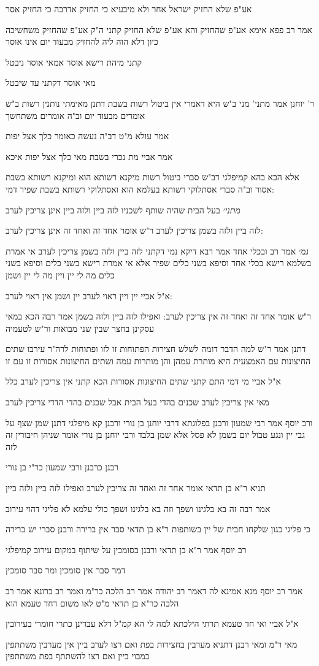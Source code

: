 \documentclass[12pt, openany]{book}
\newcommand{\sethebfont}{
\fontsize{10.5pt}{21.0pt} \selectfont
}
\newcommand{\textblock}[1]{
{\sethebfont #1\\}	
}
\begin{document}
\textblock{אע"פ שלא החזיק ישראל אחר ולא מיבעיא כי החזיק אדרבה כי החזיק אסר}
\textblock{אמר רב פפא אימא אע"פ שהחזיק והא אע"פ שלא החזיק קתני ה"ק אע"פ שהחזיק משחשיכה כיון דלא הוה ליה להחזיק מבעוד יום אינו אוסר}
\textblock{קתני מיהת רישא אוסר אמאי אוסר ניבטל}
\textblock{מאי אוסר דקתני עד שיבטל}
\textblock{ר' יוחנן אמר מתני' מני ב"ש היא דאמרי אין ביטול רשות בשבת דתנן מאימתי נותנין רשות ב"ש אומרים מבעוד יום וב"ה אומרים משתחשך}
\textblock{אמר עולא מ"ט דב"ה נעשה כאומר כלך אצל יפות}
\textblock{אמר אביי מת נכרי בשבת מאי כלך אצל יפות איכא}
\textblock{אלא הכא בהא קמיפלגי דב"ש סברי ביטול רשות מיקנא רשותא הוא ומיקנא רשותא בשבת אסור וב"ה סברי אסתלוקי רשותא בעלמא הוא ואסתלוקי רשותא בשבת שפיר דמי:}
\textblock{{\large\emph{מתני׳}} בעל הבית שהיה שותף לשכניו לזה ביין ולזה ביין אינן צריכין לערב}
\textblock{לזה ביין ולזה בשמן צריכין לערב ר"ש אומר אחד זה ואחד זה אינן צריכין לערב:}
\textblock{{\large\emph{גמ׳}} אמר רב ובכלי אחד אמר רבא דיקא נמי דקתני לזה ביין ולזה בשמן צריכין לערב אי אמרת בשלמא רישא בכלי אחד וסיפא בשני כלים שפיר אלא אי אמרת רישא בשני כלים וסיפא בשני כלים מה לי יין ויין מה לי יין ושמן}
\textblock{א"ל אביי יין ויין ראוי לערב יין ושמן אין ראוי לערב:}
\textblock{ר"ש אומר אחד זה ואחד זה אין צריכין לערב: ואפילו לזה ביין ולזה בשמן אמר רבה הכא במאי עסקינן בחצר שבין שני מבואות ור"ש לטעמיה}
\textblock{דתנן אמר ר"ש למה הדבר דומה לשלש חצירות הפתוחות זו לזו ופתוחות לרה"ר עירבו שתים החיצונות עם האמצעית היא מותרת עמהן והן מותרות עמה ושתים החיצונות אסורות זו עם זו}
\textblock{א"ל אביי מי דמי התם קתני שתים החיצונות אסורות הכא קתני אין צריכין לערב כלל}
\textblock{מאי אין צריכין לערב שכנים בהדי בעל הבית אבל שכנים בהדי הדדי צריכין לערב}
\textblock{ורב יוסף אמר רבי שמעון ורבנן בפלוגתא דרבי יוחנן בן נורי ורבנן קא מיפלגי דתנן שמן שצף על גבי יין ונגע טבול יום בשמן לא פסל אלא שמן בלבד ורבי יוחנן בן נורי אומר שניהן חיבורין זה לזה}
\textblock{רבנן כרבנן ורבי שמעון כר"י בן נורי}
\textblock{תניא ר"א בן תדאי אומר אחד זה ואחד זה צריכין לערב ואפילו לזה ביין ולזה ביין}
\textblock{אמר רבה זה בא בלגינו ושפך וזה בא בלגינו ושפך כולי עלמא לא פליגי דהוי עירוב}
\textblock{כי פליגי כגון שלקחו חבית של יין בשותפות ר"א בן תדאי סבר אין ברירה ורבנן סברי יש ברירה}
\textblock{רב יוסף אמר ר"א בן תדאי ורבנן בסומכין על שיתוף במקום עירוב קמיפלגי}
\textblock{דמר סבר אין סומכין ומר סבר סומכין}
\textblock{אמר רב יוסף מנא אמינא לה דאמר רב יהודה אמר רב הלכה כר"מ ואמר רב ברונא אמר רב הלכה כר"א בן תדאי מ"ט לאו משום דחד טעמא הוא}
\textblock{א"ל אביי ואי חד טעמא תרתי הילכתא למה לי הא קמ"ל דלא עבדינן כתרי חומרי בעירובין}
\textblock{מאי ר"מ ומאי רבנן דתניא מערבין בחצירות בפת ואם רצו לערב ביין אין מערבין משתתפין במבוי ביין ואם רצו להשתתף בפת משתתפין}
\end{document}
